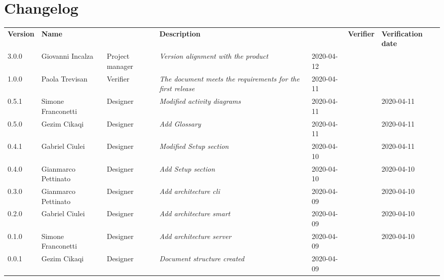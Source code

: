 \section*{Changelog}
\renewcommand{\arraystretch}{1.8}
  \setlength\LTleft{-1.7cm}
  \begin{longtable}{|p{1.7cm}|p{2cm}|p{2.5cm}|p{3cm}|p{1.7cm}|p{2cm}|p{2.3cm}|}
    \hline
    \rowcolor{header}
    \textbf{Version} & \textbf{Name} & \centering{\textbf{Role}} & \textbf{Description} &      \centering{\textbf{Date}} & \textbf{Verifier} & \textbf{Verification date} \\

    3.0.0 & Giovanni Incalza & Project manager & \small{\textit{Version alignment with the product}} & 2020-04-12 &  & \\

    1.0.0 & Paola Trevisan & Verifier & \small{\textit{The document meets the requirements for the first release}} & 2020-04-11 &  & \\
    0.5.1 & Simone Franconetti & Designer & \small{\textit{Modified activity diagrams}} & 2020-04-11 &  & 2020-04-11\\
    0.5.0 & Gezim Cikaqi & Designer & \small{\textit{Add Glossary}} & 2020-04-11 &  & 2020-04-11\\
    0.4.1 & Gabriel Ciulei & Designer & \small{\textit{Modified Setup section}} & 2020-04-10 &  & 2020-04-11\\
    0.4.0 & Gianmarco Pettinato & Designer & \small{\textit{Add Setup section}} & 2020-04-10 &  & 2020-04-10\\
    0.3.0 & Gianmarco Pettinato & Designer & \small{\textit{Add architecture cli}} & 2020-04-09 &  & 2020-04-10\\
    0.2.0 & Gabriel Ciulei & Designer & \small{\textit{Add architecture smart}} & 2020-04-09 &  & 2020-04-10\\
    0.1.0 & Simone Franconetti & Designer & \small{\textit{Add architecture server}} & 2020-04-09 &  & 2020-04-10\\
    0.0.1 & Gezim Cikaqi & Designer & \small{\textit{Document structure created}} & 2020-04-09 &  & \\

    \hline
  \end{longtable}
\setlength\LTleft{0cm}
\restoregeometry
